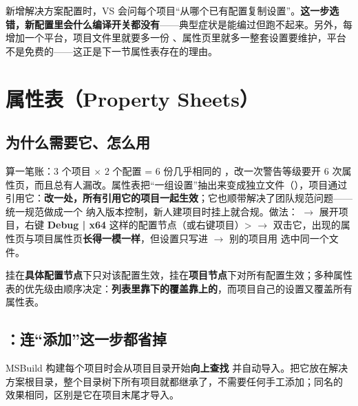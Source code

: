 {{\begin{tipbox}[提示]
新增解决方案配置时，VS 会问每个项目“从哪个已有配置复制设置”。\textbf{这一步选错，新配置里会什么编译开关都没有}——典型症状是能编过但跑不起来。另外，每增加一个平台，项目文件里就要多一份 、属性页里就多一整套设置要维护，平台不是免费的——这正是下一节属性表存在的理由。
\end{tipbox}

\section{属性表（Property Sheets）}

\subsection{为什么需要它、怎么用}

算一笔账：3 个项目 $\times$ 2 个配置 = 6 份几乎相同的 ，改一次警告等级要开 6 次属性页，而且总有人漏改。属性表把“一组设置”抽出来变成独立文件（），项目通过  引用它：\textbf{改一处，所有引用它的项目一起生效}；它也顺带解决了团队规范问题——统一规范做成一个  纳入版本控制，新人建项目时挂上就合规。做法： $\rightarrow$ 展开项目，右键 \textbf{Debug | x64} 这样的配置节点（或右键项目）>  $\rightarrow$ 双击它，出现的属性页与项目属性页\textbf{长得一模一样}，但设置只写进  $\rightarrow$ 别的项目用  选中同一个文件。

挂在\textbf{具体配置节点}下只对该配置生效，挂在\textbf{项目节点}下对所有配置生效；多种属性表的优先级由顺序决定：\textbf{列表里靠下的覆盖靠上的}，而项目自己的设置又覆盖所有属性表。

\subsection{：连“添加”这一步都省掉}

MSBuild 构建每个项目时会从项目目录开始\textbf{向上查找}  并自动导入。把它放在解决方案根目录，整个目录树下所有项目就都继承了，不需要任何手工添加；同名的  效果相同，区别是它在项目末尾才导入。

}}
